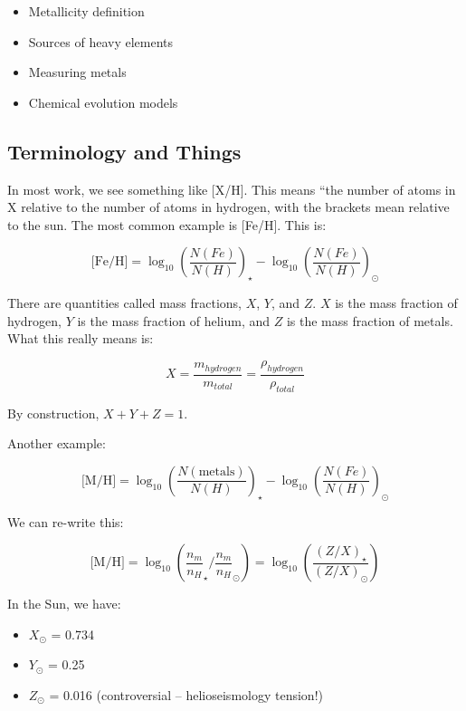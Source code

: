 \documentclass{article}
\begin{document}
\begin{itemize}
    \item Metallicity definition
    \item Sources of heavy elements
    \item Measuring metals
    \item Chemical evolution models
\end{itemize}

\subsection{Terminology and Things}

In most work, we see something like [X/H]. This means ``the number of atoms in X relative to the number of atoms in hydrogen, with the brackets mean relative to the sun. The most common example is [Fe/H]. This is:

\begin{equation}
    \text{[Fe/H]} = \log_{10} \left(\frac{N(Fe)}{N(H)}\right)_\star - \log_{10}\left(\frac{N(Fe)}{N(H)}\right)_\odot
\end{equation}

There are quantities called mass fractions, $X$, $Y$, and $Z$. $X$ is the mass fraction of hydrogen, $Y$ is the mass fraction of helium, and $Z$ is the mass fraction of metals. What this really means is:

\begin{equation}
    X = \frac{m_{hydrogen}}{m_{total}} = \frac{\rho_{hydrogen}}{\rho_{total}}
\end{equation}

By construction, $X+Y+Z = 1$. 

Another example:

\begin{equation}
    \text{[M/H]} = \log_{10} \left(\frac{N(\text{metals})}{N(H)}\right)_\star - \log_{10}\left(\frac{N(Fe)}{N(H)}\right)_\odot
\end{equation}

We can re-write this:

\begin{equation}
    \text{[M/H]} = \log_{10} \left(\frac{n_m}{n_H}_\star / \frac{n_m}{n_H}_\odot\right) = \log_{10}\left(\frac{(Z/X)_\star}{(Z/X)_\odot}\right)
\end{equation}


In the Sun, we have:

\begin{itemize}
    \item $X_\odot$ = 0.734
    \item $Y_\odot$ = 0.25
    \item $Z_\odot$ = 0.016 (controversial -- helioseismology tension!)
\end{itemize}
\end{document}
